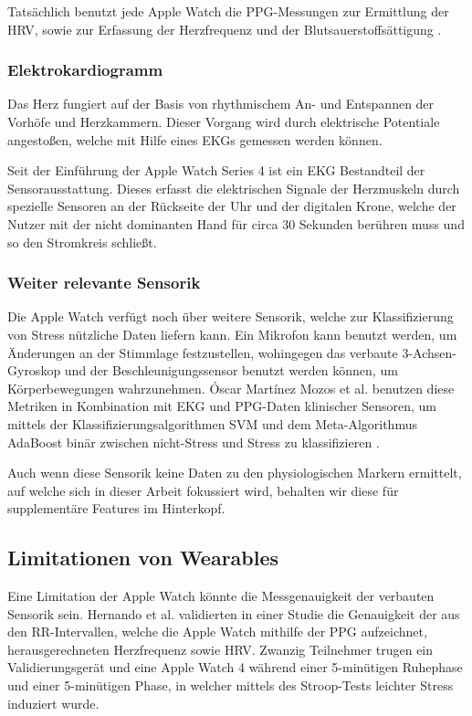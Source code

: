 Tatsächlich benutzt jede Apple Watch die \ac{PPG}-Messungen zur Ermittlung der \ac{HRV}, sowie zur Erfassung der Herzfrequenz und der Blutsauerstoffsättigung \cite{Apple2023}.

\subsubsection{Elektrokardiogramm}

Das Herz fungiert auf der Basis von rhythmischem An- und Entspannen der Vorhöfe und Herzkammern. Dieser Vorgang wird durch elektrische Potentiale angestoßen, welche mit Hilfe eines \ac{EKG}s gemessen werden können.

Seit der Einführung der Apple Watch Series 4 ist ein \ac{EKG} Bestandteil der Sensorausstattung. Dieses erfasst die elektrischen Signale der Herzmuskeln durch spezielle Sensoren an der Rückseite der Uhr und der digitalen Krone, welche der Nutzer mit der nicht dominanten Hand für circa 30 Sekunden berühren muss und so den Stromkreis schließt.

\subsubsection{Weiter relevante Sensorik}

Die Apple Watch verfügt noch über weitere Sensorik, welche zur Klassifizierung von Stress nützliche Daten liefern kann. Ein Mikrofon kann benutzt werden, um Änderungen an der Stimmlage festzustellen, wohingegen das verbaute 3-Achsen-Gyroskop und der Beschleunigungssensor benutzt werden können, um Körperbewegungen wahrzunehmen. Óscar Martínez Mozos et al. benutzen diese Metriken in Kombination mit \ac{EKG} und \ac{PPG}-Daten klinischer Sensoren, um mittels der Klassifizierungsalgorithmen \ac{SVM} und dem Meta-Algorithmus \ac{AdaBoost} binär zwischen nicht-Stress und Stress zu klassifizieren \cite{Mozos2017StressDU}.

Auch wenn diese Sensorik keine Daten zu den physiologischen Markern ermittelt, auf welche sich in dieser Arbeit fokussiert wird, behalten wir diese für supplementäre Features im Hinterkopf.

\subsection{Limitationen von Wearables}

Eine Limitation der Apple Watch könnte die Messgenauigkeit der verbauten Sensorik sein. Hernando et al. validierten in einer Studie die Genauigkeit der aus den RR-Intervallen, welche die Apple Watch mithilfe der \ac{PPG} aufzeichnet, herausgerechneten Herzfrequenz sowie \ac{HRV}. Zwanzig Teilnehmer trugen ein Validierungsgerät und eine Apple Watch 4 während einer 5-minütigen Ruhephase und einer 5-minütigen Phase, in welcher mittels des Stroop-Tests leichter Stress induziert wurde.

